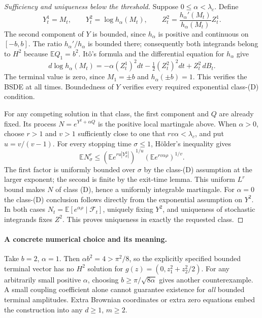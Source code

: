 \documentclass[11pt,a4paper]{article}
\newcommand{\E}{\mathbb E}
\theoremstyle{definition}
\theoremstyle{remark}
\begin{document}
\begin{proof}[Sufficiency and uniqueness below the threshold]
Suppose $0\leq\alpha<\lambda_c$. Define
\[
 Y_t^1=M_t,\qquad Y_t^2=\log h_\alpha(M_t),\qquad
 Z_t^2=\frac{h_\alpha'(M_t)}{h_\alpha(M_t)}Z_t^1.
\]
The second component of $Y$ is bounded, since $h_\alpha$ is positive and continuous on $[-b,b]$. The ratio $h_\alpha'/h_\alpha$ is bounded there; consequently both integrands belong to $H^2$ because $\E Q_1=b^2$. It\^o's formula and the differential equation for $h_\alpha$ give
\[
 d\log h_\alpha(M_t)
 =-\alpha(Z_t^1)^2dt-\tfrac12(Z_t^2)^2dt+Z_t^2\,dB_t.
\]
The terminal value is zero, since $M_1=\pm b$ and $h_\alpha(\pm b)=1$. This verifies the BSDE at all times. Boundedness of $Y$ verifies every required exponential class-(D) condition.

For any competing solution in that class, the first component and $Q$ are already fixed. Its process $N=e^{Y^2+\alpha Q}$ is the positive local martingale above. When $\alpha>0$, choose $r>1$ and $v>1$ sufficiently close to one that $rv\alpha<\lambda_c$, and put $u=v/(v-1)$. For every stopping time $\sigma\leq1$, H\"older's inequality gives
\[
 \E N_\sigma^r\leq
 \left(\E e^{ru|Y_\sigma^2|}\right)^{1/u}
 \left(\E e^{rv\alpha\rho}\right)^{1/v}.
\]
The first factor is uniformly bounded over $\sigma$ by the class-(D) assumption at the larger exponent; the second is finite by the exit-time lemma. This uniform $L^r$ bound makes $N$ of class (D), hence a uniformly integrable martingale. For $\alpha=0$ the class-(D) conclusion follows directly from the exponential assumption on $Y^2$. In both cases
$N_t=\E[e^{\alpha\rho}\mid\mathcal F_t]$, uniquely fixing $Y^2$, and uniqueness of stochastic integrands fixes $Z^2$. This proves uniqueness in exactly the requested class.
\end{proof}

\paragraph{A concrete numerical choice and its meaning.}
Take $b=2$, $\alpha=1$. Then $\alpha b^2=4>\pi^2/8$, so the explicitly specified bounded terminal vector has no $H^2$ solution for $g(z)=(0,z_1^2+z_2^2/2)$. For any arbitrarily small positive $\alpha$, choosing $b\geq\pi/\sqrt{8\alpha}$ gives another counterexample. A small coupling coefficient alone cannot guarantee existence for \emph{all} bounded terminal amplitudes. Extra Brownian coordinates or extra zero equations embed the construction into any $d\geq1$, $m\geq2$.
\end{document}
